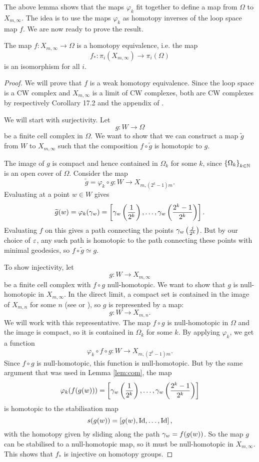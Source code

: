 The above lemma shows that the maps $\varphi_k$ fit together to define
a map from $\Omega$ to $X_{m,\infty}$.
The idea is to use the maps $\varphi_k$ as homotopy inverses of the
loop space map $f$. We are now ready to prove the result.

\begin{theorem}
  \label{thm:loekker}
  The map $f : X_{m,\infty} \to \Omega$ is a homotopy
  equivalence, i.e. the map
  \[f_* : \pi_i(X_{m,\infty}) \to \pi_i(\Omega)\]
  is an isomorphism for all $i$.
\end{theorem}

\begin{proof}
  We will prove that $f$ is a weak homotopy equivalence. Since the
  loop space is a CW complex and $X_{m,\infty}$ is a limit of CW
  complexes, both are CW complexes by respectively Corollary
  17.2 and the appendix of \cite{milnor}.
  
  We will start with surjectivity. Let
  \[ g : W \to \Omega \]
  be a finite cell complex in $\Omega$. We want to show that we can
  construct a map $\widetilde g$ from $W$ to $X_{m,\infty}$ such that
  the composition $f\circ \widetilde g$ is homotopic to $g$.
  
  The image of $g$ is compact and hence contained in $\Omega_k$ for
  some $k$, since $\left\{ \Omega_k \right\}_{k\in\mathbb{N}}$ is an open cover of
  $\Omega$. Consider the map 
  \[ \widetilde g = \varphi_k\circ g : W \to X_{m,(2^k-1)m}. \]
  Evaluating at a point $w\in W$ gives
  \[ \widetilde g(w) = \varphi_k(\gamma_w) = \left[
    \gamma_w\left(\frac{1}{2^k}\right),\dots,
    \gamma_w\left(\frac{2^k-1}{2^k}\right) \right]. \]
  Evaluating $f$ on this gives a path connecting the points
  $\gamma_w\left(\frac{j}{2^k}\right)$. But by our choice of $\varepsilon$, any
  such path is homotopic to the path connecting these points with
  minimal geodesics, so $f\circ\widetilde g \simeq g$.

  To show injectivity, let
  \[ g : W \to X_{m,\infty}\]
  be a finite cell complex with $f\circ g$ null-homotopic. We want to
  show that $g$ is null-homotopic in $X_{m,\infty}$. In the
  direct limit, a compact set is contained in the image of $X_{m,n}$
  for some $n$ (see \cite[Proposition~A.1]{hatcher} or
  \cite[Chapter~9.4]{may}), so $g$ is represented by a map:
  \[ g : W \to X_{m,n}. \]
  We will work with this representative. The map $f\circ
  g$ is null-homotopic in $\Omega$ and the image is compact, so it is
  contained in $\Omega_k$ for some $k$. By applying $\varphi_k$, we
  get a function
  \[ \varphi_k\circ f\circ g : W \to X_{m,(2^k-1)m}. \]
  Since $f\circ g$ is null-homotopic, this function is
  null-homotopic. But by the same argument that was used in
  Lemma \ref{lem:com}, the map
  \[ \varphi_k(f(g(w))) = \left[
    \gamma_w\left(\frac{1}{2^k}\right),\dots,\gamma_w\left(\frac{2^k-1}{2^k}
    \right)\right] \] 
  is homotopic to the stabilisation map
  \[ s(g(w)) = \left[g(w),\operatorname{Id},\dots,\operatorname{Id}\right], \]
  with the homotopy given by sliding along the path $\gamma_w=f(g(w))$.
  So the map $g$ can be stabilised to a null-homotopic map, so it must
  be null-homotopic in $X_{m,\infty}$. This shows that $f_*$ is
  injective on homotopy groups.
\end{proof}

